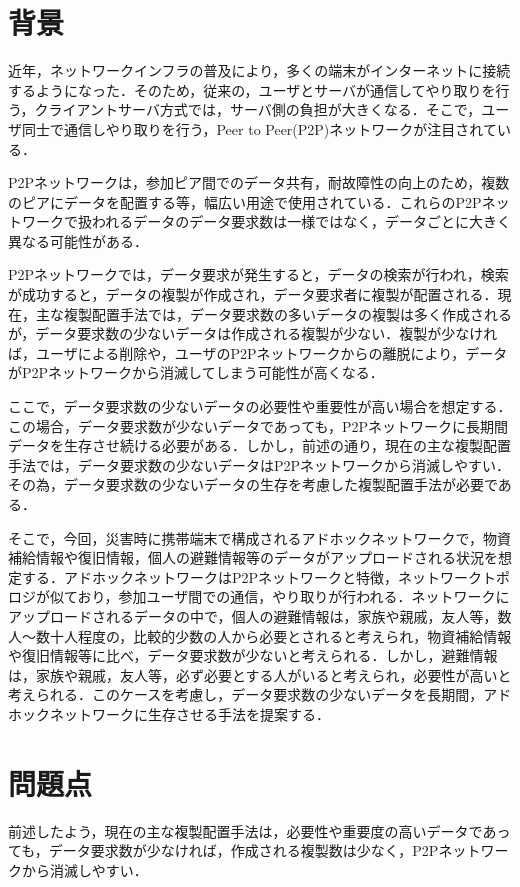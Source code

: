 \documentclass[11pt]{jreport}
\begin{document}
\section{背景}
近年，ネットワークインフラの普及により，多くの端末がインターネットに接続するようになった．そのため，従来の，ユーザとサーバが通信してやり取りを行う，クライアントサーバ方式では，サーバ側の負担が大きくなる．そこで，ユーザ同士で通信しやり取りを行う，Peer to Peer(P2P)ネットワークが注目されている．
\par P2Pネットワークは，参加ピア間でのデータ共有，耐故障性の向上のため，複数のピアにデータを配置する等，幅広い用途で使用されている．これらのP2Pネットワークで扱われるデータのデータ要求数は一様ではなく，データごとに大きく異なる可能性がある．
\par P2Pネットワークでは，データ要求が発生すると，データの検索が行われ，検索が成功すると，データの複製が作成され，データ要求者に複製が配置される．現在，主な複製配置手法では，データ要求数の多いデータの複製は多く作成されるが，データ要求数の少ないデータは作成される複製が少ない．複製が少なければ，ユーザによる削除や，ユーザのP2Pネットワークからの離脱により，データがP2Pネットワークから消滅してしまう可能性が高くなる．
\par ここで，データ要求数の少ないデータの必要性や重要性が高い場合を想定する．この場合，データ要求数が少ないデータであっても，P2Pネットワークに長期間データを生存させ続ける必要がある．しかし，前述の通り，現在の主な複製配置手法では，データ要求数の少ないデータはP2Pネットワークから消滅しやすい．その為，データ要求数の少ないデータの生存を考慮した複製配置手法が必要である．
\par そこで，今回，災害時に携帯端末で構成されるアドホックネットワークで，物資補給情報や復旧情報，個人の避難情報等のデータがアップロードされる状況を想定する．アドホックネットワークはP2Pネットワークと特徴，ネットワークトポロジが似ており，参加ユーザ間での通信，やり取りが行われる．ネットワークにアップロードされるデータの中で，個人の避難情報は，家族や親戚，友人等，数人〜数十人程度の，比較的少数の人から必要とされると考えられ，物資補給情報や復旧情報等に比べ，データ要求数が少ないと考えられる．しかし，避難情報は，家族や親戚，友人等，必ず必要とする人がいると考えられ，必要性が高いと考えられる．このケースを考慮し，データ要求数の少ないデータを長期間，アドホックネットワークに生存させる手法を提案する．

\section{問題点}
前述したよう，現在の主な複製配置手法は，必要性や重要度の高いデータであっても，データ要求数が少なければ，作成される複製数は少なく，P2Pネットワークから消滅しやすい．
\end{document}
